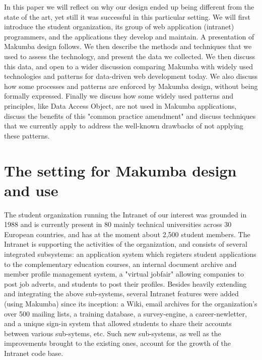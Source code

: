 \documentclass{llncs}
\begin{document}
In this paper we will  reflect on why our design ended up being different from the state of the art, yet still it was successful in this particular setting. We will first introduce the student organization, its group of web application (intranet) programmers, and the applications they develop and maintain. A presentation of Makumba design follows. We then describe the methods and techniques that we used to assess the technology, and present the data we collected. We then discuss this data, and open to  a wider discussion comparing Makumba with widely used technologies and patterns for data-driven web development today. We also discuss how some processes and patterns are enforced by Makumba design, without being formally expressed. Finally we discuss how some widely used patterns and principles, like Data Access Object, are not used in Makumba applications, discuss the benefits of this "common practice amendment" and discuss techniques that we currently apply to address the well-known drawbacks of not applying these patterns.

\section{The setting for Makumba design and use}\label{sec:setting}
The student organization running the Intranet of our interest was grounded in 1988 and is currently present in 80 mainly technical universities across 30 European countries, and has at the moment about 2,500 student members. The Intranet is supporting the activities of the organization, and consists of several integrated subsystems: an application system which registers student applications to the complementary education courses, an internal document archive and member profile management system, a "virtual jobfair" allowing companies to post job adverts, and students to post their profiles. Besides heavily extending and integrating the above sub-systems, several Intranet features were added (using Makumba) since its inception: a Wiki, email archives for the organization's over 500 mailing lists, a training database, a survey-engine, a career-newletter, and a unique sign-in system that allowed students to share their accounts between various sub-sytems, etc. Such new sub-systems, as well as the improvements brought to the existing ones, account for the growth of the Intranet code base.
\end{document}
